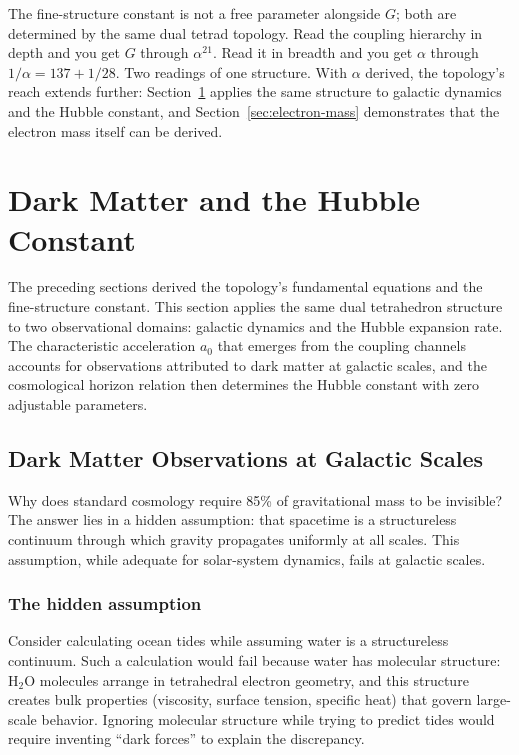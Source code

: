 \documentclass[aps,prd,preprint,superscriptaddress,showpacs,preprintnumbers,amsmath,amssymb,nofootinbib]{revtex4-2}
\begin{document}
The fine-structure constant is not a free parameter alongside $G$; both are determined by the same dual tetrad topology. Read the coupling hierarchy in depth and you get $G$ through $\alpha^{21}$. Read it in breadth and you get $\alpha$ through $1/\alpha = 137 + 1/28$. Two readings of one structure. With $\alpha$ derived, the topology's reach extends further: Section~\ref{sec:darkmatter} applies the same structure to galactic dynamics and the Hubble constant, and Section~\ref{sec:electron-mass} demonstrates that the electron mass itself can be derived.

\section{Dark Matter and the Hubble Constant}
\label{sec:darkmatter}

The preceding sections derived the topology's fundamental equations and the fine-structure constant. This section applies the same dual tetrahedron structure to two observational domains: galactic dynamics and the Hubble expansion rate. The characteristic acceleration $a_0$ that emerges from the coupling channels accounts for observations attributed to dark matter at galactic scales, and the cosmological horizon relation then determines the Hubble constant with zero adjustable parameters.

\subsection{Dark Matter Observations at Galactic Scales}
\label{subsec:darkmatter}

Why does standard cosmology require 85\% of gravitational mass to be invisible? The answer lies in a hidden assumption: that spacetime is a structureless continuum through which gravity propagates uniformly at all scales. This assumption, while adequate for solar-system dynamics, fails at galactic scales.

\subsubsection*{The hidden assumption}

Consider calculating ocean tides while assuming water is a structureless continuum. Such a calculation would fail because water has molecular structure: $\text{H}_2\text{O}$ molecules arrange in tetrahedral electron geometry, and this structure creates bulk properties (viscosity, surface tension, specific heat) that govern large-scale behavior. Ignoring molecular structure while trying to predict tides would require inventing ``dark forces'' to explain the discrepancy.
\end{document}
